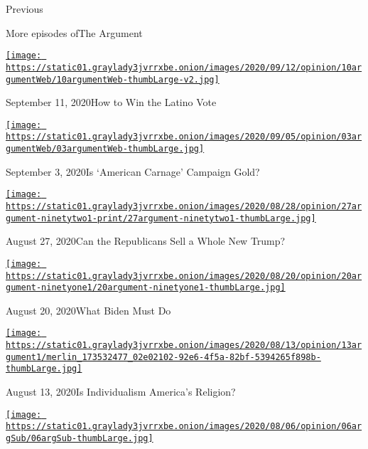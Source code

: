 Previous

More episodes ofThe Argument

\href{https://www.nytimes3xbfgragh.onion/2020/09/11/opinion/the-argument-latino-2020-vote.html?action=click\&module=audio-series-bar\&region=header\&pgtype=Article}{\texttt{[image: https://static01.graylady3jvrrxbe.onion/images/2020/09/12/opinion/10argumentWeb/10argumentWeb-thumbLarge-v2.jpg]}}

September 11, 2020How to Win the Latino Vote

\href{https://www.nytimes3xbfgragh.onion/2020/09/03/opinion/the-argument-trump-biden-kenosha-portland.html?action=click\&module=audio-series-bar\&region=header\&pgtype=Article}{\texttt{[image: https://static01.graylady3jvrrxbe.onion/images/2020/09/05/opinion/03argumentWeb/03argumentWeb-thumbLarge.jpg]}}

September 3, 2020Is `American Carnage' Campaign Gold?

\href{https://www.nytimes3xbfgragh.onion/2020/08/27/opinion/the-argument-republican-convention-trump.html?action=click\&module=audio-series-bar\&region=header\&pgtype=Article}{\texttt{[image: https://static01.graylady3jvrrxbe.onion/images/2020/08/28/opinion/27argument-ninetytwo1-print/27argument-ninetytwo1-thumbLarge.jpg]}}

August 27, 2020Can the Republicans Sell a Whole New Trump?

\href{https://www.nytimes3xbfgragh.onion/2020/08/20/opinion/the-argument-democratic-convention-biden.html?action=click\&module=audio-series-bar\&region=header\&pgtype=Article}{\texttt{[image: https://static01.graylady3jvrrxbe.onion/images/2020/08/20/opinion/20argument-ninetyone1/20argument-ninetyone1-thumbLarge.jpg]}}

August 20, 2020What Biden Must Do

\href{https://www.nytimes3xbfgragh.onion/2020/08/13/opinion/the-argument-coronavirus-catholic-covid.html?action=click\&module=audio-series-bar\&region=header\&pgtype=Article}{\texttt{[image: https://static01.graylady3jvrrxbe.onion/images/2020/08/13/opinion/13argument1/merlin\_173532477\_02e02102-92e6-4f5a-82bf-5394265f898b-thumbLarge.jpg]}}

August 13, 2020Is Individualism America's Religion?

\href{https://www.nytimes3xbfgragh.onion/2020/08/06/opinion/the-argument-trump-coronavirus-election.html?action=click\&module=audio-series-bar\&region=header\&pgtype=Article}{\texttt{[image: https://static01.graylady3jvrrxbe.onion/images/2020/08/06/opinion/06argSub/06argSub-thumbLarge.jpg]}}

